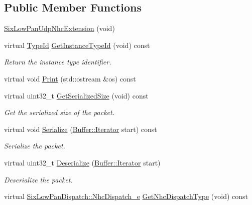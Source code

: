 \subsection*{Public Member Functions}
\begin{DoxyCompactItemize}
\item 
\hyperlink{classns3_1_1SixLowPanUdpNhcExtension_a1102bebd1cea4f078232c521fd0adf49}{Six\+Low\+Pan\+Udp\+Nhc\+Extension} (void)
\item 
virtual \hyperlink{classns3_1_1TypeId}{Type\+Id} \hyperlink{classns3_1_1SixLowPanUdpNhcExtension_a233028f37132735bbd8019c5468e65c0}{Get\+Instance\+Type\+Id} (void) const 
\begin{DoxyCompactList}\small\item\em Return the instance type identifier. \end{DoxyCompactList}\item 
virtual void \hyperlink{classns3_1_1SixLowPanUdpNhcExtension_aaa38ae4d0fe37668d47b2e920588bee5}{Print} (std\+::ostream \&os) const 
\item 
virtual uint32\+\_\+t \hyperlink{classns3_1_1SixLowPanUdpNhcExtension_a81b268ac04f2bac21429d375eee519fd}{Get\+Serialized\+Size} (void) const 
\begin{DoxyCompactList}\small\item\em Get the serialized size of the packet. \end{DoxyCompactList}\item 
virtual void \hyperlink{classns3_1_1SixLowPanUdpNhcExtension_a119c2e18b012b963aa6035cec1de920e}{Serialize} (\hyperlink{classns3_1_1Buffer_1_1Iterator}{Buffer\+::\+Iterator} start) const 
\begin{DoxyCompactList}\small\item\em Serialize the packet. \end{DoxyCompactList}\item 
virtual uint32\+\_\+t \hyperlink{classns3_1_1SixLowPanUdpNhcExtension_a873d3fa917255c4cc936a6ac288f7c85}{Deserialize} (\hyperlink{classns3_1_1Buffer_1_1Iterator}{Buffer\+::\+Iterator} start)
\begin{DoxyCompactList}\small\item\em Deserialize the packet. \end{DoxyCompactList}\item 
virtual \hyperlink{classns3_1_1SixLowPanDispatch_acbf93399dca3b5424dcc76de45a57f5f}{Six\+Low\+Pan\+Dispatch\+::\+Nhc\+Dispatch\+\_\+e} \hyperlink{classns3_1_1SixLowPanUdpNhcExtension_aff4e54e1fbd08da83175dcf1b5f159ce}{Get\+Nhc\+Dispatch\+Type} (void) const 

\end{DoxyCompactItemize}
